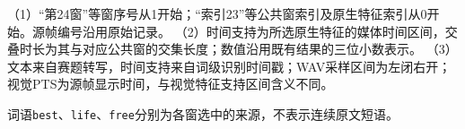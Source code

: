 \begin{table}[!htbp]
\par\vspace{0.35em}\begin{minipage}{\textwidth}\setlength{\parindent}{0pt}
（1）“第24窗”等窗序号从1开始；“索引23”等公共窗索引及原生特征索引从0开始。源帧编号沿用原始记录。
（2）时间支持为所选原生特征的媒体时间区间，交叠时长为其与对应公共窗的交集长度；数值沿用既有结果的三位小数表示。
（3）文本来自赛题转写，时间支持来自词级识别时间戳；WAV采样区间为左闭右开；视觉PTS为源帧显示时间，与视觉特征支持区间含义不同。\par
\noindent 词语\texttt{best}、\texttt{life}、\texttt{free}分别为各窗选中的来源，不表示连续原文短语。

\end{minipage}

\endgroup
\end{table}
